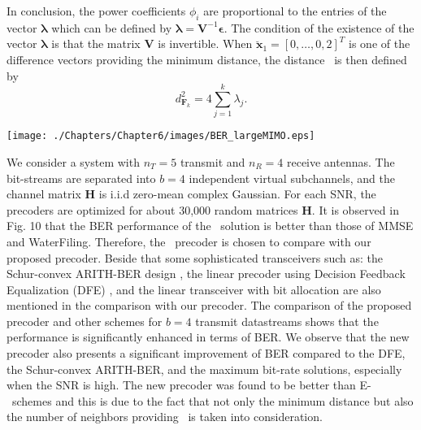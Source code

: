 In conclusion, the power coefficients $\phi_i$ are proportional to the entries of the vector $\mathbf{\lambda}$ which can be defined by $\mathbf{\lambda} =\mathbf{V}^{-1} \mathbf{\epsilon}$. The condition of the existence of the vector $\mathbf{\lambda}$ is that the matrix $\mathbf{V}$ is invertible. When $\breve{\mathbf{x}}_1 = [0,\hdots, 0, 2]^T$ is one of the difference vectors providing the minimum distance, the distance \dmin\ is then defined by
\begin{equation}
\label{eq:ab6_distance_Fk}
	d^2_{\mathbf{F}_k} = 4 \sum_{j=1}^k \lambda_j .
\end{equation}

\begin{center}
\texttt{[image: ./Chapters/Chapter6/images/BER\_largeMIMO.eps]}
\end{center} 
We consider a system with  $n_T=5$ transmit and $n_R=4$ receive antennas. The bit-streams are separated into $b=4$ independent virtual subchannels, and the channel matrix $\mathbf{H}$ is i.i.d zero-mean complex Gaussian. For each SNR, the precoders are optimized for about 30,000 random matrices $\mathbf{H}$. It is observed in Fig. 10 that the BER performance of the \maxlmin\ solution is better than those of MMSE and WaterFiling. Therefore, the \maxlmin\ precoder is chosen to compare with our proposed precoder. Beside that some sophisticated transceivers such as: the Schur-convex ARITH-BER design \cite{palomar2003joint}, the linear precoder using Decision Feedback Equalization (DFE) \cite{shenouda2008framework}, and the linear transceiver with bit allocation \cite{li2009optimization} are also mentioned in the comparison with our precoder. The comparison of the proposed precoder and other schemes for $b=4$ transmit datastreams shows that the performance is significantly enhanced in terms of BER. We observe that the new precoder also presents a significant improvement of BER compared to the DFE, the Schur-convex ARITH-BER, and the maximum bit-rate solutions, especially when the SNR is high. The new precoder was found to be better than E-\dmin\ schemes and this is due to the fact that not only the minimum distance but also the number of neighbors providing \dmin\ is taken into consideration.

